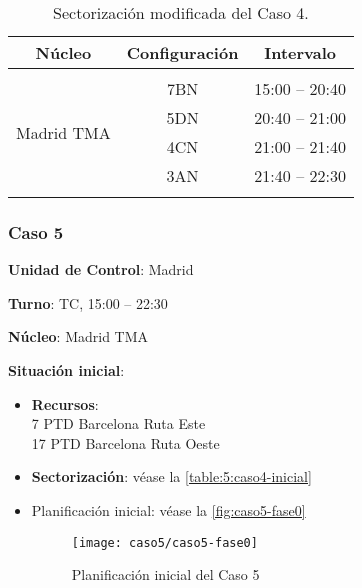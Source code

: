 \begin{table}[h]
	\centering
	\caption{Sectorización modificada del Caso 4.}
	\label{table:D:caso4-modif}
	\begin{tabular}{lcl}
		\hline
		\multicolumn{1}{c}{\textbf{Núcleo}}              & \textbf{Configuración} & \multicolumn{1}{c}{\textbf{Intervalo}} \\ \hline
		& \multicolumn{1}{l}{}   &                                        \\
		\multicolumn{1}{l|}{\multirow{4}{*}{Madrid TMA}} & 7BN                    & 15:00 -- 20:40                         \\
		\multicolumn{1}{l|}{}                            & 5DN                    & 20:40 -- 21:00                         \\
		\multicolumn{1}{l|}{}                            & 4CN                    & 21:00 -- 21:40                         \\
		\multicolumn{1}{l|}{}                            & 3AN                    & 21:40 -- 22:30                         \\
		\multicolumn{1}{c}{}                             &                        & \multicolumn{1}{c}{}                   \\ \hline
	\end{tabular}
\end{table}

\subsubsection{Caso 5}

\textbf{Unidad de Control}: Madrid

\textbf{Turno}: TC, 15:00 -- 22:30

\textbf{Núcleo}: Madrid TMA

\textbf{Situación inicial}:
\begin{itemize}[label={}]
	
	\item \textbf{Recursos}: \\
	7 PTD Barcelona Ruta Este \\
	17 PTD Barcelona Ruta Oeste
	
	
	\item \textbf{Sectorización}: véase la \autoref{table:5:caso4-inicial}
	
	\item Planificación inicial: véase la \autoref{fig:caso5-fase0}

	\begin{figure}[!h]
		\centering
		\texttt{[image: caso5/caso5-fase0]}
		\caption{Planificación inicial del Caso 5}
		\label{fig:5:caso5-fase0}
	\end{figure}

\end{itemize}

